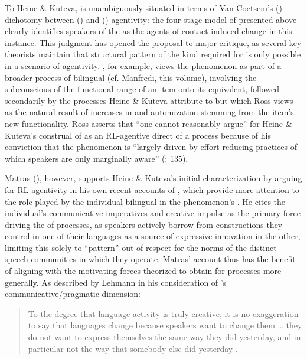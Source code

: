\documentclass[output=paper]{langsci/langscibook}
\begin{document}
To Heine \& Kuteva,  is unambiguously situated in terms of Van Coetsem’s (\citeyear{VanCoetsem1988,VanCoetsem2000}) dichotomy between  () and  () agentivity: the four-stage model of  presented above clearly identifies speakers of the  as the agents of contact-induced change in this instance. This judgment has opened the proposal to major critique, as several key theorists maintain that structural pattern  of the kind required for  is only possible in a scenario of  agentivity. \citet{Ross2007}, for example, views the phenomenon as part of a broader process of bilingual  (cf. Manfredi, this volume), involving the subconscious  of the functional range of an  item onto its  equivalent, followed secondarily by the processes Heine \& Kuteva attribute to  but which Ross views as the natural result of increases in  and automization stemming from the  item’s new functionality. Ross asserts that “one cannot reasonably argue” for Heine \& Kuteva’s construal of  as an RL-agentive direct  of a  process because of his conviction that the phenomenon is “largely driven by effort reducing practices of which speakers are only marginally aware” (\citeyear{Ross2007}: 135). 

Matras (\citeyear{Matras2009,Matras2011gram}), however, supports Heine \& Kuteva’s initial characterization by arguing for RL-agentivity in his own recent accounts of , which provide more attention to the role played by the individual bilingual in the phenomenon’s . He cites the individual’s communicative imperatives and creative impulse as the primary force driving the  of  processes, as speakers actively borrow from constructions they control in one of their languages as a source of expressive innovation in the other, limiting this  solely to “pattern” out of respect for the norms of the distinct speech communities in which they operate. Matras’ account thus has the benefit of aligning with the motivating forces theorized to obtain for  processes more generally. As described by Lehmann in his consideration of ’s communicative/pragmatic dimension:

\begin{quote}
To the degree that language activity is truly creative, it is no exaggeration to say that languages change because speakers want to change them … they do not want to express themselves the same way they did yesterday, and in particular not the way that somebody else did yesterday \citep[315]{Lehmann1985}.
\end{quote}
\end{document}
